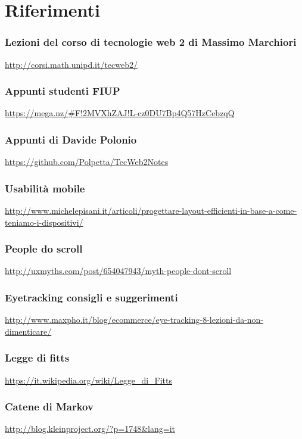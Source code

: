 
\chapter*{Riferimenti}

	\subsection*{Lezioni del corso di tecnologie web 2 di Massimo Marchiori}
		\url{http://corsi.math.unipd.it/tecweb2/}
		
	\subsection*{Appunti studenti FIUP}
		\url{https://mega.nz/#F!2MVXhZAJ!L-cz0DU7Bp4Q57HzCebzqQ}

\subsection*{Appunti di Davide Polonio}
\url{https://github.com/Polpetta/TecWeb2Notes}

\subsection*{Usabilità mobile} 
\url{http://www.michelepisani.it/articoli/progettare-layout-efficienti-in-base-a-come-teniamo-i-dispositivi/}

\subsection*{People do scroll}
\url{http://uxmyths.com/post/654047943/myth-people-dont-scroll}

\subsection*{Eyetracking consigli e suggerimenti}
\url{http://www.maxpho.it/blog/ecommerce/eye-tracking-8-lezioni-da-non-dimenticare/}

\subsection*{Legge di fitts}
\url{https://it.wikipedia.org/wiki/Legge_di_Fitts}

\subsection*{Catene di Markov}
\url{http://blog.kleinproject.org/?p=1748&lang=it}

